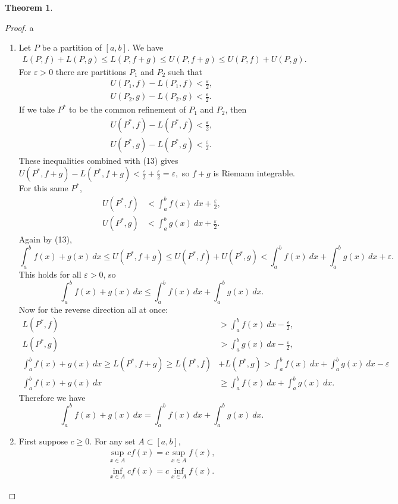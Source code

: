 \documentclass{article}
\theoremstyle{definition}
\newtheorem{theorem}{Theorem}[section]
\begin{document}
\begin{theorem}
\begin{proof}{\color{white}a}
			\begin{enumerate}
				\item Let $ P $ be a partition of $ [a,b] $. We have 
				\begin{align}
					L(P,f)+L(P,g)\le L(P,f+g)\le U(P,f+g)\le U(P,f)+U(P,g).
				\end{align}
				For $ \varepsilon>0 $ there are partitions $ P_1 $ and $ P_2 $ such that\begin{align*}
					U(P_1,f)-L(P_1,f)<\frac{\varepsilon}{2},\\
					U(P_2,g)-L(P_2,g)<\frac{\varepsilon}{2}.
				\end{align*}
				If we take $ P^* $ to be the common refinement of $ P_1 $ and $ P_2 $, then 
				\begin{align*}
					U( P^*,f)-L( P^*,f)<\frac{\varepsilon}{2},\\
					U( P^*,g)-L( P^*,g)<\frac{\varepsilon}{2}.
				\end{align*}
				These inequalities combined with (13) gives $U(P^*,f+g)-L(P^*,f+g)<\frac{\varepsilon}{2}+\frac{\varepsilon}{2}=\varepsilon ,$ so $ f+g $ is Riemann integrable.
				For this same $ P^* $, \begin{align*}
					U(P^*,f)&<\int_{a}^{b} f(x)\ dx +\frac{\varepsilon}{2},\\
					U(P^*,g)&<\int_{a}^{b} g(x)\ dx +\frac{\varepsilon}{2}.
				\end{align*}
				Again by (13), $$ \int_{a}^{b}f(x)+g(x)\ dx\le U(P^*,f+g)\le U(P^*,f)+U(P^*,g)<\int_{a}^{b} f(x)\ dx +\int_{a}^{b} g(x)\ dx +\varepsilon.$$ This holds for all $ \varepsilon>0 $, so $$\int_{a}^{b}f(x)+g(x)\ dx\le\int_{a}^{b} f(x)\ dx +\int_{a}^{b} g(x)\ dx. $$ Now for the reverse direction all at once: 
				\begin{align*}
					L(P^*,f)&>\int_{a}^{b} f(x)\ dx -\frac{\varepsilon}{2},\\
					L(P^*,g)&>\int_{a}^{b} g(x)\ dx -\frac{\varepsilon}{2},\\
					\int_{a}^{b}f(x)+g(x)\ dx\ge L(P^*,f+g)\ge L(P^*,f)&+L(P^*,g)>\int_{a}^{b} f(x)\ dx +\int_{a}^{b} g(x)\ dx -\varepsilon\\\int_{a}^{b}f(x)+g(x)\ dx&\ge\int_{a}^{b} f(x)\ dx +\int_{a}^{b} g(x)\ dx.
				\end{align*}
				Therefore we have $$\int_{a}^{b}f(x)+g(x)\ dx=\int_{a}^{b} f(x)\ dx +\int_{a}^{b} g(x)\ dx. $$
				\item 	First suppose $ c\ge 0 $. For any set $ A\subset [a,b] $, \begin{align*}
					\sup\limits_{x\in A} cf(x)=c\sup\limits_{x\in A} f(x),\\\inf\limits_{x\in A} cf(x)=c\inf\limits_{x\in A} f(x).

\end{align*}
\end{enumerate}
\end{proof}
\end{theorem}
\end{document}
